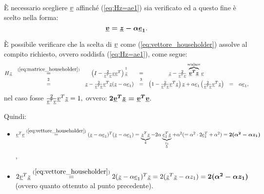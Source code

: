 
È necessario scegliere $\uline v$ affinché (\ref{eq:Hz=ae1}) sia verificato ed a questo fine è scelto nella forma:
\begin{equation}\label{eq:vettore_householder}
    \boldsymbol{\uline v = \uline z-\alpha\uline e_1}.
\end{equation}

È possibile verificare che la scelta di $\uline v$ come (\ref{eq:vettore_householder}) assolve al compito richiesto, ovvero soddisfa (\ref{eq:Hz=ae1}), come segue:
\begin{equation*}
    \begin{matrix}
        H\uline z &\overset{(\ref{eq:matrice_householder})}{=}&\left(I-\frac{2}{\uline v^T\uline v}\uline v\uline v^T\right)\overset{\footnotemark}{\uline z}&=&\uline z - \frac{2}{\uline v^T\uline v}\overbrace{\boldsymbol{\uline v^T\uline z}}^{\text{scalare}}\uline v\\
        &\overset{\footnotemark}{=}& \uline z - \frac{2}{\uline v^T\uline v}\uline v^T\uline z(\uline z - \alpha \uline e_1) &\overset{\footnotemark}{=}& \left(1 - \frac{2}{\uline v^T\uline v}\uline v^T\uline z \right)\uline z + \alpha \uline e_1\left(\frac{2}{\uline v^T\uline v}\uline v^T\uline z\right) &=& \alpha\uline e_1,
    \end{matrix}
\end{equation*}
nel caso fosse $\frac{2}{\uline v^T\uline v}\uline v^T\uline z=1,$ ovvero: $\boldsymbol{ 2\uline v^T\uline z = \uline v^T\uline v}.$

\addtocounter{footnote}{-2}



Quindi:
\begin{itemize}
    \item $\uline v^T\uline v \overset{(\ref{eq:vettore_householder})}{=}(\uline z -\alpha\uline e_1)^T(\uline z -\alpha\uline e_1)=\underbrace{\uline z^T\uline z}_{\footnotemark}-2\alpha\underbrace{\uline e_1^T\uline z}_{\underset{\footnotemark}{z_1}}+\alpha^2(=\alpha^2\cdot 2\uline e_1^T+\alpha^2)=\boldsymbol{2(\alpha^2-\alpha z_1)}$,
    \item $2\uline v^T\uline z\overset{(\ref{eq:vettore_householder})}{=} 2(\uline z - \alpha\uline e_1)^T\uline z = 2(\uline z^T \uline z - \alpha z_1) = \boldsymbol{2(\alpha^2-\alpha z_1)}$ (ovvero quanto ottenuto al punto precedente).
\end{itemize}

